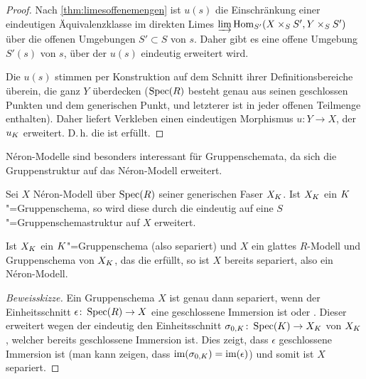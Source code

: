 \documentclass[german]{scrreprt}
\begin{document}
\begin{Satz}
\begin{proof}
    Nach \autoref{thm:limesoffenemengen} ist $u(s)$ die Einschränkung
    einer eindeutigen Äquivalenzklasse im direkten Limes
    $\varinjlim \operatorname{Hom}_{S'}(X\times_S S', Y\times_S S')$ über die
    offenen Umgebungen $S'\subset S$ von $s$.
    Daher gibt es eine offene Umgebung $S'(s)$ von $s$, über der $u(s)$
    eindeutig erweitert wird.
    
    Die $u(s)$ stimmen per Konstruktion auf dem Schnitt ihrer
    Definitionsbereiche überein,
    die ganz $Y$ überdecken ($\operatorname{Spec}(R)$ besteht genau aus seinen
    geschlossen Punkten und dem generischen Punkt, und letzterer ist
    in jeder offenen Teilmenge enthalten).
    Daher liefert Verkleben einen eindeutigen Morphismus
    $u\colon Y\to X$, der $u_{K}$ erweitert.
    D.\,h. die \NAbbEig ist erfüllt.
  \end{proof}
\end{Satz}


Néron-Modelle sind besonders interessant für Gruppenschemata, da sich
die Gruppenstruktur auf das Néron-Modell erweitert.

\begin{Bemerkung}\label{thm:gruppenschemaerweiterung}
  Sei $X$ Néron-Modell über $\operatorname{Spec}(R)$ seiner generischen Faser
  $X_{K}$. Ist $X_{K}$ ein $K$"=Gruppenschema, so wird diese durch die
  \NAbbEig eindeutig auf eine
  $S$"=Gruppenschemastruktur auf $X$ erweitert.
  \cite[1.2, Proposition 6]{neron}
\end{Bemerkung}

\begin{Bemerkung}\label{nerongruppenschemaglatt}
  Ist $X_{K}$ ein $K$"=Gruppenschema (also separiert) und $X$ ein
  glattes $R$-Modell und Gruppenschema von $X_{K}$, das die
  \NAbbEig erfüllt, so ist $X$ bereits separiert,
  also ein Néron-Modell.
  \cite[1.2, Remark 7]{neron} 
  \begin{proof}[Beweisskizze]
    Ein Gruppenschema $X$ ist genau dann separiert, wenn der
    Einheitsschnitt $\epsilon\colon\operatorname{Spec}(R)\to X$ eine geschlossene
    Immersion ist
    \cite[Lemma 38.6.1]{stacksproject} oder \cite[7.1, Lemma 2]{neron}.
    Dieser erweitert wegen der \NAbbEig eindeutig
    den Einheitsschnitt $\sigma_{0,K}\colon\operatorname{Spec}(K)\to X_{K}$ von
    $X_{K}$, welcher bereits geschlossene Immersion ist.
    Dies zeigt, dass $\epsilon$ geschlossene Immersion ist
    (man kann zeigen, dass $\text{im}(\sigma_{0,K})=\text{im}(\epsilon)$) und
    somit ist $X$ separiert. 
  \end{proof}
\end{Bemerkung}
\end{document}
